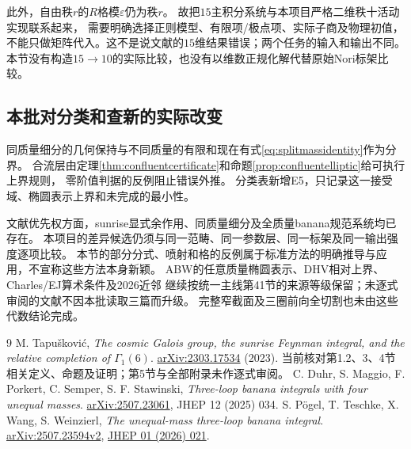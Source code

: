 \documentclass[11pt,a4paper]{ctexart}
\theoremstyle{cnplain}\newtheorem{theorem}{定理}[section]
\theoremstyle{definition}\newtheorem{definition}[theorem]{定义}
\theoremstyle{remark}\newtheorem{remark}[theorem]{注}
\begin{document}
此外，自由秩$r$的$R$格模$\varepsilon$仍为秩$r$。
故把$15$主积分系统与本项目严格二维秩十活动实现联系起来，
需要明确选择正则模型、有限项/极点项、实际子商及物理初值，
不能只做矩阵代入。这不是说文献的$15$维结果错误；两个任务的输入和输出不同。
本节没有构造$15\to10$的实际比较，也没有以维数正规化解代替原始Nori标架比较。

\subsection{本批对分类和查新的实际改变}
同质量细分的几何保持与不同质量的有限和现在有式\eqref{eq:splitmassidentity}作为分界。
合流层由定理\ref{thm:confluentcertificate}和命题\ref{prop:confluentelliptic}给可执行上界规则，
零阶值判据的反例阻止错误外推。
分类表新增E5，只记录这一接受域、椭圆表示上界和未完成的最小性。

文献优先权方面，sunrise显式余作用、同质量细分及全质量banana规范系统均已存在。
本项目的差异候选仍须与同一范畴、同一参数层、同一标架及同一输出强度逐项比较。
本节的部分分式、喷射和格的反例属于标准方法的明确推导与应用，不宣称这些方法本身新颖。
ABW的任意质量椭圆表示、DHV相对上界、Charles/EJ算术条件及2026近邻
继续按统一主线第41节的来源等级保留；未逐式审阅的文献不因本批读取三篇而升级。
完整窄截面及三圈前向全切割也未由这些代数结论完成。


\begin{thebibliography}{9}
M. Tapušković,
\emph{The cosmic Galois group, the sunrise Feynman integral, and the relative completion of $\Gamma_1(6)$}.
\href{https://arxiv.org/abs/2303.17534}{arXiv:2303.17534} (2023).
当前核对第1.2、3、4节相关定义、命题及证明；第5节与全部附录未作逐式审阅。
C. Duhr, S. Maggio, F. Porkert, C. Semper, S. F. Stawinski,
\emph{Three-loop banana integrals with four unequal masses}.
\href{https://arxiv.org/abs/2507.23061}{arXiv:2507.23061}, JHEP 12 (2025) 034.
S. Pögel, T. Teschke, X. Wang, S. Weinzierl,
\emph{The unequal-mass three-loop banana integral}.
\href{https://arxiv.org/abs/2507.23594v2}{arXiv:2507.23594v2},
\href{https://doi.org/10.1007/JHEP01(2026)021}{JHEP 01 (2026) 021}.
\end{thebibliography}
\end{document}
